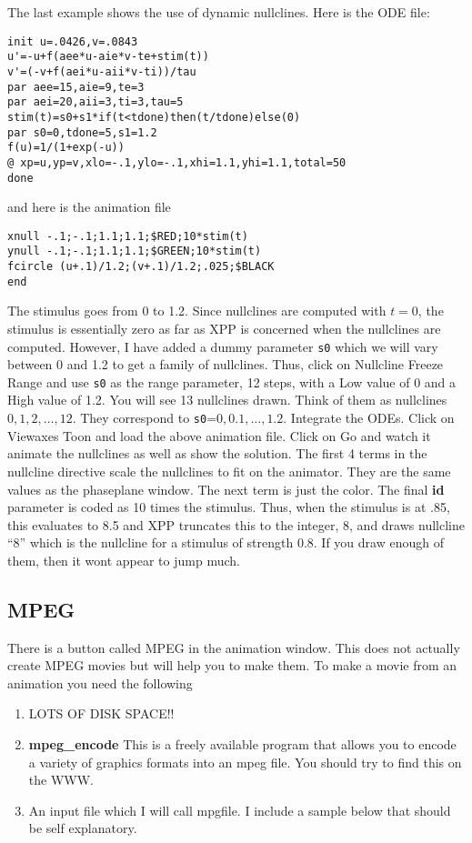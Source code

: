 \documentclass{article}
\begin{document}
The last example shows the use of dynamic nullclines. Here is the ODE
file:
\begin{verbatim}
init u=.0426,v=.0843
u'=-u+f(aee*u-aie*v-te+stim(t))
v'=(-v+f(aei*u-aii*v-ti))/tau
par aee=15,aie=9,te=3
par aei=20,aii=3,ti=3,tau=5
stim(t)=s0+s1*if(t<tdone)then(t/tdone)else(0)
par s0=0,tdone=5,s1=1.2
f(u)=1/(1+exp(-u))
@ xp=u,yp=v,xlo=-.1,ylo=-.1,xhi=1.1,yhi=1.1,total=50
done
\end{verbatim}
and here is the animation file
\begin{verbatim}
xnull -.1;-.1;1.1;1.1;$RED;10*stim(t)
ynull -.1;-.1;1.1;1.1;$GREEN;10*stim(t)
fcircle (u+.1)/1.2;(v+.1)/1.2;.025;$BLACK
end
\end{verbatim}
The stimulus goes from 0 to 1.2.  Since nullclines are computed with
$t=0$, the stimulus is essentially zero as far as XPP is concerned
when the nullclines are computed.  However, I have added a dummy
parameter {\tt s0} which we will vary between 0 and 1.2 to get a
family of nullclines.  Thus, click on Nullcline Freeze Range and use
{\tt s0} as the range parameter, 12 steps, with a Low value of 0 and a
High value of 1.2.  You will see 13 nullclines drawn. Think of them as
nullclines $0,1,2,\ldots,12$.  They correspond to {\tt s0}=$0,
0.1,\ldots, 1.2.$   Integrate the ODEs.   Click on Viewaxes Toon and
load the above animation file.  Click on Go and watch it animate the
nullclines as well as show the solution.  The first 4 terms in the
nullcline directive scale the nullclines to fit on the animator.  They
are the same values as the phaseplane window.  The next term is just
the color.  The final {\bf id} parameter is coded as 10 times the
stimulus.  Thus, when the stimulus is at .85, this evaluates to 8.5
and XPP truncates this to the integer, 8, and draws nullcline ``8''
which is the nullcline for a stimulus of strength 0.8.  If you draw
enough of them, then it wont appear to jump much.

\subsection{MPEG}  There is a button called MPEG in the animation
window. This does not actually create MPEG movies but will help you to
make them. To make a movie from an animation you need the following
\begin{enumerate}
\item LOTS OF DISK SPACE!!
\item {\bf mpeg\_encode} This is a freely available program that allows
you to encode a variety of graphics formats into an mpeg file. You
should try to find this on the WWW.
\item An input file which I will call mpgfile. I include a sample
below that should be self explanatory.
\end{enumerate}
\end{document}
